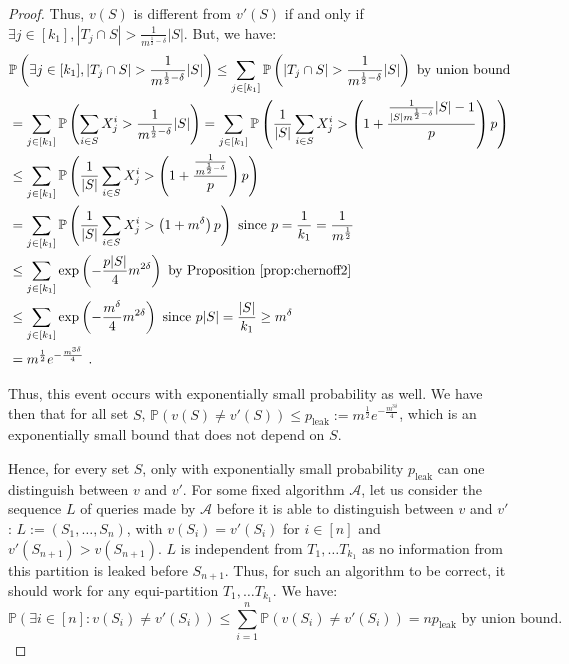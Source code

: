 \begin{proof}
    Thus, $v(S)$ is different from $v'(S)$ if and only if $\exists j \in [k_1], |T_j \cap S| > \frac{1}{m^{\frac{1}{2}-\delta}}|S|$. But, we have:
    \begin{equation}
      \begin{aligned}
        &\mathbb{P}\left(\exists j \in [k_1], |T_j \cap S| > \frac{1}{m^{\frac{1}{2}-\delta}}|S|\right) \leq \sum_{j \in [k_1]} \mathbb{P}\left(|T_j \cap S| > \frac{1}{m^{\frac{1}{2}-\delta}}|S|\right) \text{ by union bound}\\
        &=\sum_{j \in [k_1]} \mathbb{P}\left(\sum_{i \in S}X_j^i > \frac{1}{m^{\frac{1}{2}-\delta}}|S|\right)
        =\sum_{j \in [k_1]} \mathbb{P}\left(\frac{1}{|S|}\sum_{i \in S}X_j^i > \left(1 + \frac{\frac{1}{|S|m^{\frac{1}{2}-\delta}}{|S|}-1}{p}\right)p \right)\\
        &\leq \sum_{j \in [k_1]} \mathbb{P}\left(\frac{1}{|S|}\sum_{i \in S}X_j^i > \left(1 + \frac{\frac{1}{m^{\frac{1}{2}-\delta}}}{p}\right)p \right)\\
        &= \sum_{j \in [k_1]} \mathbb{P}\left(\frac{1}{|S|}\sum_{i \in S}X_j^i > \left(1 + m^{\delta}\right)p \right) \text{ since } p = \frac{1}{k_1} = \frac{1}{m^{\frac{1}{2}}}\\
        &\leq \sum_{j \in [k_1]}\exp\left(-\frac{p|S|}{4}m^{2\delta}\right) \text{ by Proposition~\ref{prop:chernoff2}}\\
        &\leq \sum_{j \in [k_1]}\exp\left(-\frac{m^{\delta}}{4}m^{2\delta}\right) \text{ since } p|S| = \frac{|S|}{k_1} \geq m^{\delta}\\
        &= m^{\frac{1}{2}}e^{-\frac{m^{3\delta}}{4}}\ .
      \end{aligned}
    \end{equation}


    Thus, this event occurs with exponentially small probability as well. We have then that for all set $S$,  $\mathbb{P}\left(v(S) \not= v'(S) \right) \leq p_{\text{leak}} := m^{\frac{1}{2}}e^{-\frac{m^{3\delta}}{4}}$, which is an exponentially small bound that does not depend on $S$.

    Hence, for every set $S$, only with exponentially small probability $p_{\text{leak}}$ can one distinguish between $v$ and $v'$. For some fixed algorithm $\mathcal{A}$, let us consider the sequence $L$ of queries made by $\mathcal{A}$ before it is able to distinguish between $v$ and $v'$: $L := (S_1, \ldots, S_n)$, with $v(S_i) = v'(S_i)$ for $i \in [n]$ and $v'(S_{n+1}) > v(S_{n+1})$. $L$ is independent from $T_1, \ldots T_{k_1}$ as no information from this partition is leaked before $S_{n+1}$. Thus, for such an algorithm to be correct, it should work for any equi-partition $T_1, \ldots T_{k_1}$. We have:
    \[ \mathbb{P}\left( \exists i \in [n] : v(S_i) \not= v'(S_i) \right) \leq \sum_{i=1}^n\mathbb{P}\left(v(S_i) \not= v'(S_i) \right) = np_{\text{leak}} \text{ by union bound.}\]


\end{proof}
